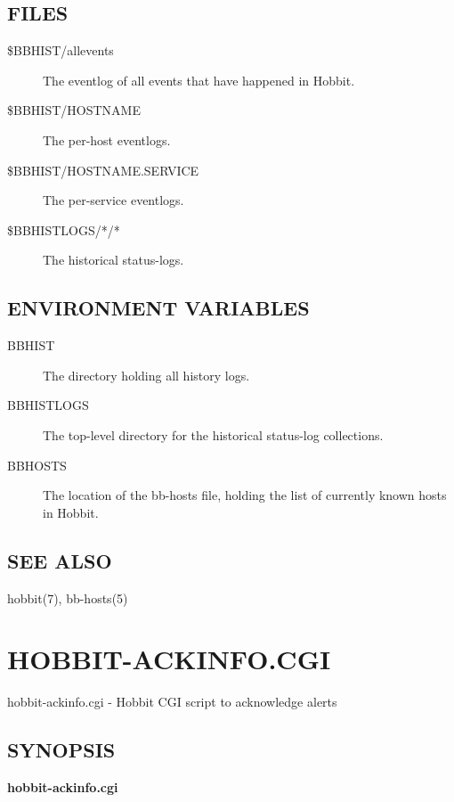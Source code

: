 \subsection{FILES}
\begin{description}
\item[\$BBHIST/allevents] The eventlog of all events that have happened in Hobbit. 

 

\item[\$BBHIST/HOSTNAME] The per-host eventlogs. 

 

\item[\$BBHIST/HOSTNAME.SERVICE] The per-service eventlogs. 

 

\item[\$BBHISTLOGS/*/*] The historical status-logs. 

 


\end{description}
\subsection{ENVIRONMENT VARIABLES}
\begin{description}
\item[BBHIST] The directory holding all history logs. 

 

\item[BBHISTLOGS] The top-level directory for the historical status-log collections. 

 

\item[BBHOSTS] The location of the bb-hosts file, holding the list of currently known hosts in Hobbit. 


\end{description}
\subsection{SEE ALSO}
hobbit(7), bb-hosts(5) 


%
\newpage
\section{HOBBIT-ACKINFO.CGI}
 hobbit-ackinfo.cgi - Hobbit CGI script to acknowledge alerts \subsection{SYNOPSIS}
\textbf{hobbit-ackinfo.cgi}


